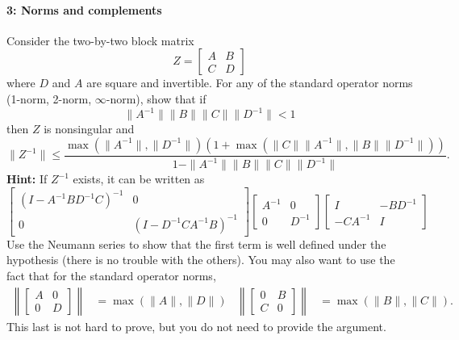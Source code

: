 \documentclass[12pt, leqno]{article}
\begin{document}
\paragraph*{3: Norms and complements}
Consider the two-by-two block matrix
\[
Z = \begin{bmatrix} A & B \\ C & D \end{bmatrix}
\]
where $D$ and $A$ are square and invertible.  For any of the standard
operator norms (1-norm, 2-norm, $\infty$-norm), show that if
\[
  \|A^{-1}\| \|B\| \|C\| \|D^{-1}\| < 1
\]
then $Z$ is nonsingular and
\[
\|Z^{-1}\| \leq
\frac{\max(\|A^{-1}\|, \|D^{-1}\|)
     (1+\max(\|C\| \|A^{-1}\|, \|B\| \|D^{-1}\|))}
     {1-\|A^{-1}\|\|B\|\|C\|\|D^{-1}\|}.
\]
{\bf Hint:} If $Z^{-1}$ exists, it can be written as
\[
\begin{bmatrix} (I-A^{-1} B D^{-1} C)^{-1} & 0 \\ 0 & (I-D^{-1} C A^{-1} B)^{-1} \end{bmatrix}
\begin{bmatrix} A^{-1} & 0 \\ 0 & D^{-1} \end{bmatrix}
\begin{bmatrix} I & -BD^{-1} \\ -CA^{-1} & I \end{bmatrix}
\]
Use the Neumann series to show that the first term is well defined
under the hypothesis (there is no trouble with the others).  You may
also want to use the fact that for the standard operator norms,
\begin{align*}
\left\| \begin{bmatrix} A & 0 \\ 0 & D \end{bmatrix} \right\| &=
\max(\|A\|, \|D\|) &
\left\| \begin{bmatrix} 0 & B \\ C & 0 \end{bmatrix} \right\| &=
\max(\|B\|, \|C\|).
\end{align*}
This last is not hard to prove, but you do not need to provide the
argument.
\end{document}
